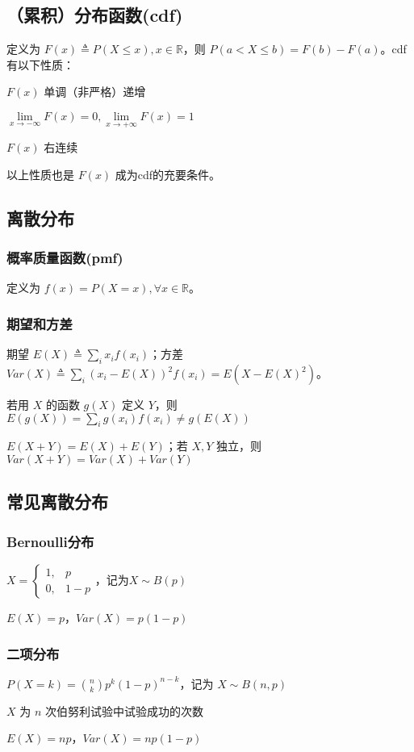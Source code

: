 \documentclass[./main.tex]{subfiles}
\begin{document}
\subsection{（累积）分布函数(cdf)}
\noindent 定义为 $F(x)\triangleq P(X\le x), x\in\mathbb{R}$，则 $P(a<X\le b)=F(b)-F(a)$。cdf有以下性质：
\begin{enumerate*}
    \item $F(x)$ 单调（非严格）递增
    \item $\lim\limits_{x\rightarrow-\infty}F(x)=0,\lim\limits_{x\rightarrow+\infty}F(x)=1$
    \item $F(x)$ 右连续
\end{enumerate*}
以上性质也是 $F(x)$ 成为cdf的充要条件。
\subsection{离散分布}
\subsubsection{概率质量函数(pmf)}
定义为 $f(x)=P(X=x), \forall x\in\mathbb{R}$。
\subsubsection{期望和方差}
期望 $E(X)\triangleq \sum_ix_if(x_i)$；方差 $Var(X)\triangleq\sum_i(x_i-E(X))^2f(x_i)=E(X-E(X)^2)$。
\begin{enumerate*}
    \item 若用 $X$ 的函数 $g(X)$ 定义 $Y$，则 $E(g(X))=\sum_{i}g(x_i)f(x_i)\neq g(E(X))$
    \item $E(X+Y)=E(X)+E(Y)$；若 $X,Y$ 独立，则 $Var(X+Y)=Var(X)+Var(Y)$
\end{enumerate*}
\subsection{常见离散分布}
\subsubsection{Bernoulli分布}
\begin{itemize*}
    \item $X=\begin{cases}1,&p\\0,&1-p\end{cases}$，记为$X\sim B(p)$
    \item $E(X)=p$，$Var(X)=p(1-p)$
\end{itemize*}
\subsubsection{二项分布}
\begin{itemize*}
    \item $P(X=k)=\binom{n}{k}p^k(1-p)^{n-k}$，记为 $X\sim B(n,p)$
    \item $X$ 为 $n$ 次伯努利试验中试验成功的次数
    \item $E(X)=np$，$Var(X)=np(1-p)$
\end{itemize*}
\end{document}
